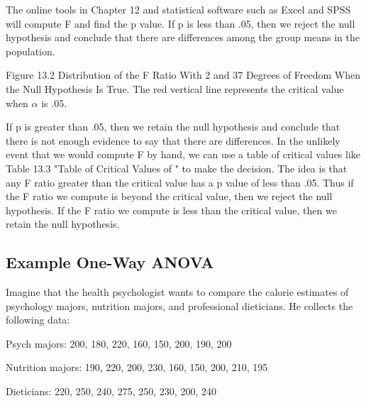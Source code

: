 The online tools in Chapter 12 and statistical software such as Excel and SPSS will compute F and find the p value. If p is less than .05, then we reject the null hypothesis and conclude that there are differences among the group
means in the population.

Figure 13.2 Distribution of the F Ratio With 2 and 37 Degrees of Freedom When the Null Hypothesis Is True. The red vertical line represents the critical value when $\alpha$ is .05.


If p is greater than .05, then we retain the null hypothesis and conclude that there is not enough evidence to say that there are differences. In the unlikely event that we would compute F by hand, we can use a table of critical values like Table 13.3 "Table of Critical Values of " to make the decision. The idea is that any F ratio greater than the critical value has a p value of less than .05. Thus if the F ratio we compute is beyond the critical value, then we reject the null hypothesis. If the F ratio we compute is less than the critical value, then we retain the null hypothesis.


\subsection{Example One-Way ANOVA}

Imagine that the health psychologist wants to compare the calorie estimates of psychology majors, nutrition majors, and professional dieticians. He collects the following data:


\begin{kframe}
Psych majors: 200, 180, 220, 160, 150, 200, 190, 200

\end{kframe}

\begin{kframe}
Nutrition majors: 190, 220, 200, 230, 160, 150, 200, 210, 195

\end{kframe}

\begin{kframe}
Dieticians: 220, 250, 240, 275, 250, 230, 200, 240

\end{kframe}


